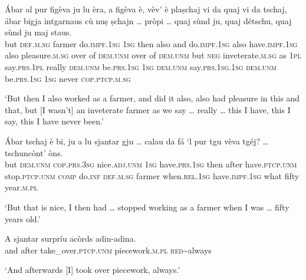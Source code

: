 \begin{linenumbers}
\gll    Ábar al pur figèva ju lu èra, a figèva è, vèv’ è plaṣchaj vi da quaj vi da tschaj, ábar bigja intgarnaus  cù nuṣ ṣchajn … pròpi … quaj sùnd ju, quaj détschu, quaj sùnd ju maj staus.\\
but \textsc{def.m.sg} farmer do.\textsc{impf.1sg} \textsc{1sg} then also and  do.\textsc{impf.1sg} also have.\textsc{impf.1sg} also pleasure.\textsc{m.sg} over of \textsc{dem.unm} over  of \textsc{dem.unm} but  \textsc{neg} inveterate.\textsc{m.sg} as \textsc{1pl} say.\textsc{prs.1pl} {} really {} \textsc{dem.unm} be.\textsc{prs.1sg} \textsc{1sg} \textsc{dem.unm} say.\textsc{prs.1sg.1sg} \textsc{dem.unm} be.\textsc{prs.1sg} \textsc{1sg} never  \textsc{cop.ptcp.m.sg}\\
\end{linenumbers}
\medskip
\glt `But then I also worked as a farmer, and did it also, also had pleasure in this and that, but [I wasn’t] an inveterate farmer as we say … really … this I have, this I say, this I have never been.'
\medskip

\begin{linenumbers}
\gll    Ábar tschaj è bi, ju a lu sjantar gju … calau da fá `l pur tgu vèva tgéj? … tschuncònt’ òns.\\
but \textsc{dem.unm} \textsc{cop.prs.3sg} nice.\textsc{adj.unm} \textsc{1sg} have.\textsc{prs.1sg} then after have.\textsc{ptcp.unm} {} stop.\textsc{ptcp.unm} \textsc{comp} do.\textsc{inf} \textsc{def.m.sg} farmer when.\textsc{rel.1sg} have.\textsc{impf.1sg} what {} fifty year.\textsc{m.pl}\\
\end{linenumbers}
\medskip
\glt `But that is nice, I then had … stopped working as a farmer when I was … fifty years old.'
\medskip

\begin{linenumbers}
\gll    A sjantar surpríu acòrds adin-adina.\\
and after take\_over.\textsc{ptcp.unm} piecework.\textsc{m.pl} \textsc{red}\textasciitilde{always} \\
\end{linenumbers}
\medskip
\glt `And afterwards [I] took over piecework, always.'

